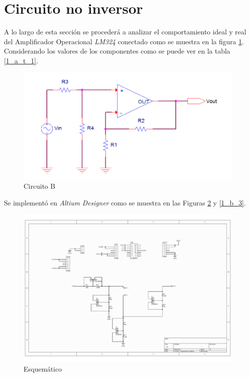\section{Circuito no inversor}

A lo largo de esta sección se procederá a analizar el comportamiento
ideal y real del Amplificador Operacional \emph{LM324 }conectado como
se muestra en la figura \ref{1_b_1}. Considerando los valores de
los componentes como se puede ver en la tabla \ref{1_a_t_1}. 

\begin{figure}[H]
\begin{centering}
\includegraphics[scale=0.5]{../Ex1/iB/Resources1b/circuit}
\par\end{centering}
\caption{Circuito B}
\label{1_b_1}

\end{figure}

Se implementó en \emph{Altium Designer }como se muestra en las Figuras
\ref{1_b_2} y \ref{1_b_3}.

\begin{figure}[H]
\begin{centering}
\includegraphics[scale=0.5]{../Ex1/iB/Resources1b/Schematic}
\par\end{centering}
\caption{Esquemático}
\label{1_b_2}

\end{figure}

